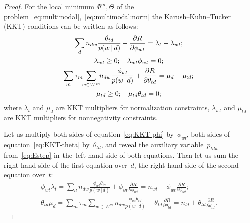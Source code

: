 \documentclass{sig-alternate-2013}
\newcommand{\cond}{\mspace{3mu}{|}\mspace{3mu}}
\begin{document}
\begin{proof}
    For the local minimum $\Phi^m,\Theta$
    of the problem~\eqref{eq:multimodal},~\eqref{eq:multimodal:norm}
    the Karush--Kuhn--Tucker (KKT) conditions can be written as follows:
    \begin{gather}
    \label{eq:KKT-phi}
        \sum_{d} n_{dw} \frac{\theta_{td}}{p(w\cond d)} + \frac{\partial R}{\partial \phi_{wt}}
        = \lambda_t - \lambda_{wt};
    \\\notag
        \lambda_{wt}\geq 0;
        \quad
        \lambda_{wt}\phi_{wt} = 0;
    \\
    \label{eq:KKT-theta}
        \sum_{m} \tau_m \!\!\sum_{w\in W^m}\!\! n_{dw} \frac{\phi_{wt}}{p(w\cond d)} + \frac{\partial R}{\partial \theta_{td}}
        = \mu_d - \mu_{td};
    \\\notag
        \mu_{td}\geq 0;
        \quad
        \mu_{td}\theta_{td} = 0;
    \end{gather}
    where $\lambda_t$ and $\mu_d$ are KKT multipliers for normalization constraints,
    $\lambda_{wt}$ and $\mu_{td}$ are KKT multipliers for nonnegativity constraints.

    Let us multiply
    both sides of equation~\eqref{eq:KKT-phi} by~$\phi_{wt}$,
    both sides of equation~\eqref{eq:KKT-theta} by~$\theta_{td}$,
    and reveal the auxiliary variable~$p_{tdw}$ from~\eqref{eq:Estep}
    in~the~left-hand side of both equations.
    Then let us sum
    the right-hand side of the first equation over~$d$,
    the right-hand side of the second equation over~$t$:
    \begin{gather*}
        \phi_{wt} \lambda_t
        =
        \sum_{d}
        n_{dw} \frac{\phi_{wt}\theta_{td}}{p(w\cond d)}
        + \phi_{wt} \frac{\partial R}{\partial \phi_{wt}}
        =
        n_{wt} + \phi_{wt} \frac{\partial R}{\partial \phi_{wt}};
    \\
        \theta_{td} \mu_{d}
        =
        \sum_{m} \tau_m \!\!\!\sum_{w\in W^m}\!\!\!
        n_{dw} \frac{\phi_{wt}\theta_{td}}{p(w\cond d)}
        + \theta_{td} \frac{\partial R}{\partial \theta_{td}}
        =
        n_{td} + \theta_{td} \frac{\partial R}{\partial \theta_{td}}.
    \end{gather*}


\end{proof}
\end{document}
